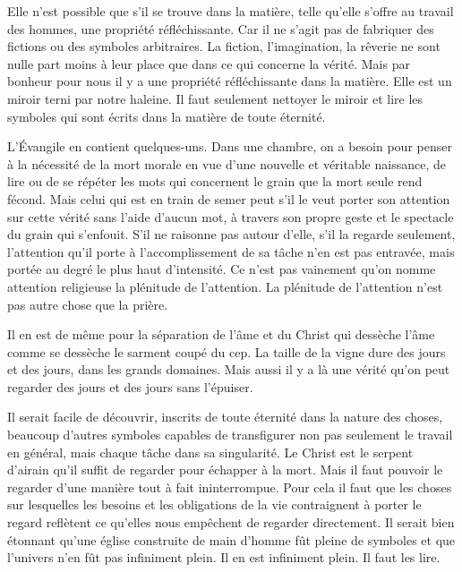 \documentclass[french,twoside]{book} %
\begin{document}
Elle n'est possible que s'il se trouve dans la matière, telle qu'elle s'offre au travail des hommes, une propriété réfléchissante. Car il ne s'agit pas de fabriquer des fictions ou des symboles arbitraires. La fiction, l'imagination, la rêverie ne sont nulle part moins à leur place que dans ce qui concerne la vérité. Mais par bonheur pour nous il y a une propriété réfléchissante dans la matière. Elle est un miroir terni par notre haleine. Il faut seulement nettoyer le miroir et lire les symboles qui sont écrits dans la matière de toute éternité.\par
L'Évangile en contient quelques-uns. Dans une chambre, on a besoin pour penser à la nécessité de la mort morale en vue d'une nouvelle et véritable naissance, de lire ou de se répéter les mots qui concernent le grain que la mort seule rend fécond. Mais celui qui est en train de semer peut s'il le veut porter son attention sur cette vérité sans l'aide d'aucun mot, à travers son propre geste et le spectacle du grain qui s'enfouit. S'il ne raisonne pas autour d'elle, s'il la regarde seulement, l'attention qu'il porte à l'accomplissement de sa tâche n'en est pas entravée, mais portée au degré le plus haut d'intensité. Ce n'est pas vainement qu'on nomme attention religieuse la plénitude de l'attention. La plénitude de l'attention n'est pas autre chose que la prière.\par
Il en est de même pour la séparation de l'âme et du Christ qui dessèche l'âme comme se dessèche le sarment coupé du cep. La taille de la vigne dure des jours et des jours, dans les grands domaines. Mais aussi il y a là une vérité qu'on peut regarder des jours et des jours sans l'épuiser.\par
Il serait facile de découvrir, inscrits de toute éternité dans la nature des choses, beaucoup d'autres symboles capables de transfigurer non pas seulement le travail en général, mais chaque tâche dans sa singularité. Le Christ est le serpent d'airain qu'il suffit de regarder pour échapper à la mort. Mais il faut pouvoir le regarder d'une manière tout à fait ininterrompue. Pour cela il faut que les choses sur lesquelles les besoins et les obligations de la vie contraignent à porter le regard reflètent ce qu'elles nous empêchent de regarder directement. Il serait bien étonnant qu'une église construite de main d'homme fût pleine de symboles et que l'univers n'en fût pas infiniment plein. Il en est infiniment plein. Il faut les lire.\par
\end{document}
